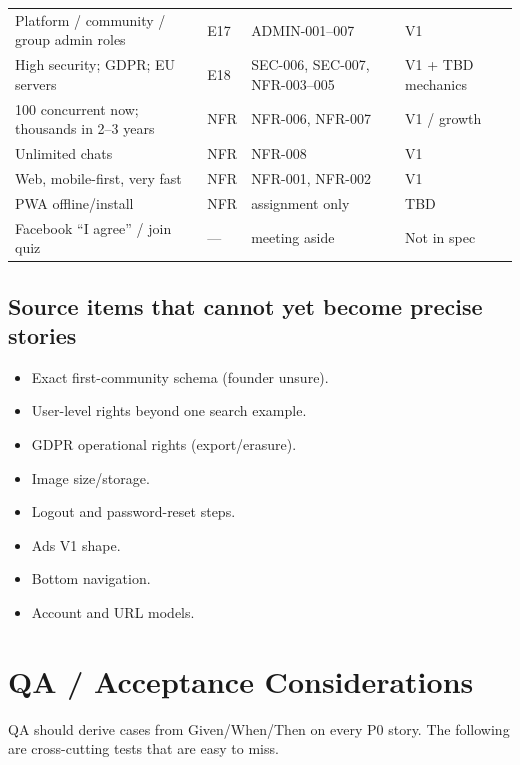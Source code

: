 \documentclass[11pt,a4paper]{article}
\begin{document}
\begin{longtable}{@{}p{5.8cm}p{2.0cm}p{3.4cm}p{2.4cm}@{}}
Platform / community / group admin roles & E17 & ADMIN-001--007 & V1 \\
High security; GDPR; EU servers & E18 & SEC-006, SEC-007, NFR-003--005 & V1 + TBD mechanics \\
100 concurrent now; thousands in 2--3 years & NFR & NFR-006, NFR-007 & V1 / growth \\
Unlimited chats & NFR & NFR-008 & V1 \\
Web, mobile-first, very fast & NFR & NFR-001, NFR-002 & V1 \\
PWA offline/install & NFR & assignment only & TBD \\
Facebook ``I agree'' / join quiz & --- & meeting aside & Not in spec \\
\end{longtable}

\subsection{Source items that cannot yet become precise stories}
\begin{itemize}
  \item Exact first-community schema (founder unsure).
  \item User-level rights beyond one search example.
  \item GDPR operational rights (export/erasure).
  \item Image size/storage.
  \item Logout and password-reset steps.
  \item Ads V1 shape.
  \item Bottom navigation.
  \item Account and URL models.
\end{itemize}

\section{QA / Acceptance Considerations}
QA should derive cases from Given/When/Then on every P0 story. The following are cross-cutting tests that are easy to miss.
\end{document}
